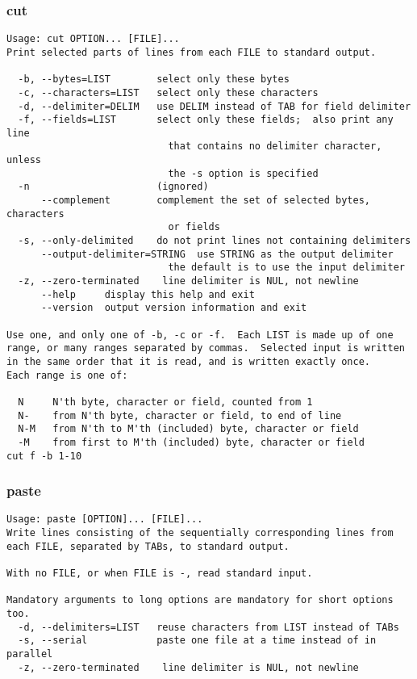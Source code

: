 \documentclass[11pt,a4paper]{article}
\newcommand{\cmd}[1]{
  \subsubsection*{#1}
  \addcontentsline{toc}{subsection}{#1}
}
\begin{document}
\cmd{cut}
% 
\begin{verbatim}
Usage: cut OPTION... [FILE]...
Print selected parts of lines from each FILE to standard output.

  -b, --bytes=LIST        select only these bytes
  -c, --characters=LIST   select only these characters
  -d, --delimiter=DELIM   use DELIM instead of TAB for field delimiter
  -f, --fields=LIST       select only these fields;  also print any line
                            that contains no delimiter character, unless
                            the -s option is specified
  -n                      (ignored)
      --complement        complement the set of selected bytes, characters
                            or fields
  -s, --only-delimited    do not print lines not containing delimiters
      --output-delimiter=STRING  use STRING as the output delimiter
                            the default is to use the input delimiter
  -z, --zero-terminated    line delimiter is NUL, not newline
      --help     display this help and exit
      --version  output version information and exit

Use one, and only one of -b, -c or -f.  Each LIST is made up of one
range, or many ranges separated by commas.  Selected input is written
in the same order that it is read, and is written exactly once.
Each range is one of:

  N     N'th byte, character or field, counted from 1
  N-    from N'th byte, character or field, to end of line
  N-M   from N'th to M'th (included) byte, character or field
  -M    from first to M'th (included) byte, character or field
cut f -b 1-10
\end{verbatim}


\cmd{paste}
\begin{verbatim}
Usage: paste [OPTION]... [FILE]...
Write lines consisting of the sequentially corresponding lines from
each FILE, separated by TABs, to standard output.

With no FILE, or when FILE is -, read standard input.

Mandatory arguments to long options are mandatory for short options too.
  -d, --delimiters=LIST   reuse characters from LIST instead of TABs
  -s, --serial            paste one file at a time instead of in parallel
  -z, --zero-terminated    line delimiter is NUL, not newline
\end{verbatim}
\end{document}
